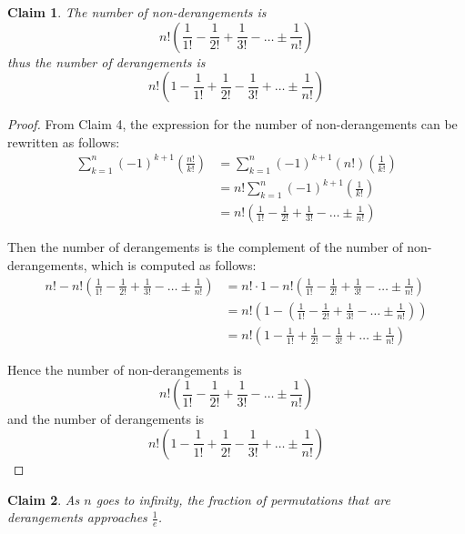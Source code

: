 \documentclass{article}
\newtheorem{claim}{Claim}
\begin{document}
\begin{claim}
    The number of non-derangements is
    \[
    n!\left(\frac{1}{1!} - \frac{1}{2!} + \frac{1}{3!} - \dots \pm \frac{1}{n!}\right)
    \]
    thus the number of derangements is
    \[
    n!\left(1 - \frac{1}{1!} + \frac{1}{2!} - \frac{1}{3!} + \dots \pm \frac{1}{n!}\right)
    \]
\end{claim}

\begin{proof}
    From Claim 4, the expression for the number of non-derangements can be rewritten as follows:
    \[
    \begin{aligned}
    \sum_{k=1}^{n}(-1)^{k+1}\left(\frac{n!}{k!}\right) &= \sum_{k=1}^{n}(-1)^{k+1}(n!)\left(\frac{1}{k!}\right) \\
    &= n!\sum_{k=1}^{n}(-1)^{k+1}\left(\frac{1}{k!}\right) \\
    &= n!\left(\frac{1}{1!} - \frac{1}{2!} + \frac{1}{3!} - \dots \pm \frac{1}{n!}\right)
    \end{aligned}
    \]

    \medskip

    Then the number of derangements is the complement of the number of non-derangements, which is computed as follows:
    \[
    \begin{aligned}
    n! - n!\left(\frac{1}{1!} - \frac{1}{2!} + \frac{1}{3!} - \dots \pm \frac{1}{n!}\right) &= n! \cdot 1 - 
    n!\left(\frac{1}{1!} - \frac{1}{2!} + \frac{1}{3!} - \dots \pm \frac{1}{n!}\right) \\
    &= n!\left(1 - \left(\frac{1}{1!} - \frac{1}{2!} + \frac{1}{3!} - \dots \pm \frac{1}{n!}\right)\right) \\
    &= n!\left(1 - \frac{1}{1!} + \frac{1}{2!} - \frac{1}{3!} + \dots \pm \frac{1}{n!}\right)
    \end{aligned}
    \]

    \medskip

    Hence the number of non-derangements is
    \[
    n!\left(\frac{1}{1!} - \frac{1}{2!} + \frac{1}{3!} - \dots \pm \frac{1}{n!}\right)
    \]
    and the number of derangements is
    \[
    n!\left(1 - \frac{1}{1!} + \frac{1}{2!} - \frac{1}{3!} + \dots \pm \frac{1}{n!}\right)
    \]
\end{proof}

\begin{claim}
    As $n$ goes to infinity, the fraction of permutations that are derangements approaches $\frac{1}{e}$.
\end{claim}
\end{document}
